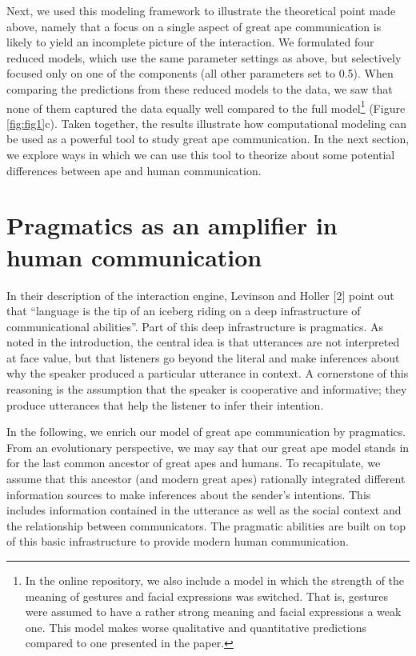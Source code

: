 \documentclass[
  english,
  man,floatsintext]{apa6}
\begin{document}
Next, we used this modeling framework to illustrate the theoretical point made above, namely that a focus on a single aspect of great ape communication is likely to yield an incomplete picture of the interaction. We formulated four reduced models, which use the same parameter settings as above, but selectively focused only on one of the components (all other parameters set to 0.5). When comparing the predictions from these reduced models to the data, we saw that none of them captured the data equally well compared to the full model\footnote{In the online repository, we also include a model in which the strength of the meaning of gestures and facial expressions was switched. That is, gestures were assumed to have a rather strong meaning and facial expressions a weak one. This model makes worse qualitative and quantitative predictions compared to one presented in the paper.} (Figure \ref{fig:fig1}c). Taken together, the results illustrate how computational modeling can be used as a powerful tool to study great ape communication. In the next section, we explore ways in which we can use this tool to theorize about some potential differences between ape and human communication.

\hypertarget{pragmatics-as-an-amplifier-in-human-communication}{%
\section{Pragmatics as an amplifier in human communication}\label{pragmatics-as-an-amplifier-in-human-communication}}

In their description of the interaction engine, Levinson and Holler {[}2{]} point out that ``language is the tip of an iceberg riding on a deep infrastructure of communicational abilities''. Part of this deep infrastructure is pragmatics. As noted in the introduction, the central idea is that utterances are not interpreted at face value, but that listeners go beyond the literal and make inferences about why the speaker produced a particular utterance in context. A cornerstone of this reasoning is the assumption that the speaker is cooperative and informative; they produce utterances that help the listener to infer their intention.

In the following, we enrich our model of great ape communication by pragmatics. From an evolutionary perspective, we may say that our great ape model stands in for the last common ancestor of great apes and humans. To recapitulate, we assume that this ancestor (and modern great apes) rationally integrated different information sources to make inferences about the sender's intentions. This includes information contained in the utterance as well as the social context and the relationship between communicators. The pragmatic abilities are built on top of this basic infrastructure to provide modern human communication.
\end{document}
